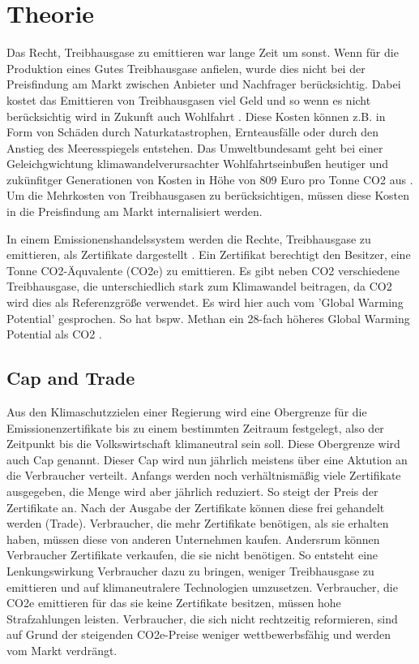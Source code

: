 \chapter{Theorie}

Das Recht, Treibhausgase zu emittieren war lange Zeit um sonst. 
Wenn für die Produktion eines Gutes Treibhausgase anfielen, wurde dies nicht bei der Preisfindung am Markt zwischen Anbieter und Nachfrager berücksichtig. 
Dabei kostet das Emittieren von Treibhausgasen viel Geld und so wenn es nicht berücksichtig wird in Zukunft auch Wohlfahrt \cite[S. 25]{rabe.2018} \cite{ub4.2023}. 
Diese Kosten können z.B. in Form von Schäden durch Naturkatastrophen, Ernteausfälle oder durch den Anstieg des Meeresspiegels entstehen. 
Das Umweltbundesamt geht bei einer Geleichgwichtung klimawandelverursachter Wohlfahrtseinbußen heutiger und zukünfitger Generationen von Kosten in Höhe von 809 Euro pro Tonne CO2 aus \cite{ub4.2023}.
Um die Mehrkosten von Treibhausgasen zu berücksichtigen, müssen diese Kosten in die Preisfindung am Markt internalisiert werden.

In einem Emissionenshandelssystem werden die Rechte, Treibhausgase zu emittieren, als Zertifikate dargestellt \cite[S. 27]{rabe.2018}. 
Ein Zertifikat berechtigt den Besitzer, eine Tonne CO2-Äquvalente (CO2e) zu emittieren. 
Es gibt neben CO2 verschiedene Treibhausgase, die unterschiedlich stark zum Klimawandel beitragen, da CO2 wird dies als Referenzgröße verwendet. 
Es wird hier auch vom 'Global Warming Potential' gesprochen. So hat bspw. Methan ein 28-fach höheres Global Warming Potential als CO2 \cite{ub.2023}.

\section{Cap and Trade}

Aus den Klimaschutzzielen einer Regierung wird eine Obergrenze für die Emissionenzertifikate bis zu einem bestimmten Zeitraum festgelegt, also der Zeitpunkt bis die Volkswirtschaft klimaneutral sein soll.
Diese Obergrenze wird auch Cap genannt. Dieser Cap wird nun jährlich meistens über eine Aktution an die Verbraucher verteilt. 
Anfangs werden noch verhältnismäßig viele Zertifikate ausgegeben, die Menge wird aber jährlich reduziert. So steigt der Preis der Zertifikate an. Nach der Ausgabe der Zertifikate können diese frei gehandelt werden (Trade). Verbraucher, die mehr Zertifikate benötigen, als sie erhalten haben, müssen diese von anderen Unternehmen kaufen. 
Andersrum können Verbraucher Zertifikate verkaufen, die sie nicht benötigen. So entsteht eine Lenkungswirkung Verbraucher dazu zu bringen, weniger Treibhausgase zu emittieren und auf klimaneutralere Technologien umzusetzen. 
Verbraucher, die CO2e emittieren für das sie keine Zertifikate besitzen, müssen hohe Strafzahlungen leisten. Verbraucher, die sich nicht rechtzeitig reformieren, sind auf Grund der steigenden CO2e-Preise weniger wettbewerbsfähig und werden vom Markt verdrängt.

